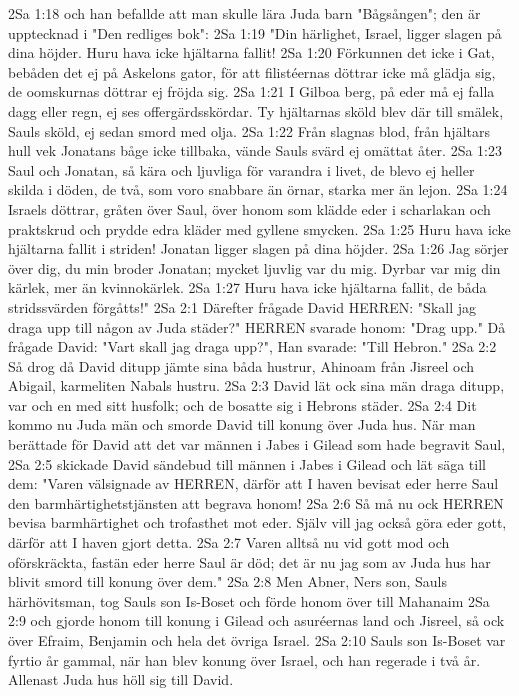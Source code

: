 2Sa 1:18  och han befallde att man skulle lära Juda barn "Bågsången"; den är upptecknad i "Den redliges bok":
2Sa 1:19  "Din härlighet, Israel, ligger slagen på dina höjder. Huru hava icke hjältarna fallit!
2Sa 1:20  Förkunnen det icke i Gat, bebåden det ej på Askelons gator, för att filistéernas döttrar icke må glädja sig, de oomskurnas döttrar ej fröjda sig.
2Sa 1:21  I Gilboa berg, på eder må ej falla dagg eller regn, ej ses offergärdsskördar. Ty hjältarnas sköld blev där till smälek, Sauls sköld, ej sedan smord med olja.
2Sa 1:22  Från slagnas blod, från hjältars hull vek Jonatans båge icke tillbaka, vände Sauls svärd ej omättat åter.
2Sa 1:23  Saul och Jonatan, så kära och ljuvliga för varandra i livet, de blevo ej heller skilda i döden, de två, som voro snabbare än örnar, starka mer än lejon.
2Sa 1:24  Israels döttrar, gråten över Saul, över honom som klädde eder i scharlakan och praktskrud och prydde edra kläder med gyllene smycken.
2Sa 1:25  Huru hava icke hjältarna fallit i striden! Jonatan ligger slagen på dina höjder.
2Sa 1:26  Jag sörjer över dig, du min broder Jonatan; mycket ljuvlig var du mig. Dyrbar var mig din kärlek, mer än kvinnokärlek.
2Sa 1:27  Huru hava icke hjältarna fallit, de båda stridssvärden förgåtts!"
2Sa 2:1  Därefter frågade David HERREN: "Skall jag draga upp till någon av Juda städer?" HERREN svarade honom: "Drag upp." Då frågade David: "Vart skall jag draga upp?", Han svarade: "Till Hebron."
2Sa 2:2  Så drog då David ditupp jämte sina båda hustrur, Ahinoam från Jisreel och Abigail, karmeliten Nabals hustru.
2Sa 2:3  David lät ock sina män draga ditupp, var och en med sitt husfolk; och de bosatte sig i Hebrons städer.
2Sa 2:4  Dit kommo nu Juda män och smorde David till konung över Juda hus. När man berättade för David att det var männen i Jabes i Gilead som hade begravit Saul,
2Sa 2:5  skickade David sändebud till männen i Jabes i Gilead och lät säga till dem: "Varen välsignade av HERREN, därför att I haven bevisat eder herre Saul den barmhärtighetstjänsten att begrava honom!
2Sa 2:6  Så må nu ock HERREN bevisa barmhärtighet och trofasthet mot eder. Själv vill jag också göra eder gott, därför att I haven gjort detta.
2Sa 2:7  Varen alltså nu vid gott mod och oförskräckta, fastän eder herre Saul är död; det är nu jag som av Juda hus har blivit smord till konung över dem."
2Sa 2:8  Men Abner, Ners son, Sauls härhövitsman, tog Sauls son Is-Boset och förde honom över till Mahanaim
2Sa 2:9  och gjorde honom till konung i Gilead och asuréernas land och Jisreel, så ock över Efraim, Benjamin och hela det övriga Israel.
2Sa 2:10  Sauls son Is-Boset var fyrtio år gammal, när han blev konung över Israel, och han regerade i två år. Allenast Juda hus höll sig till David.
